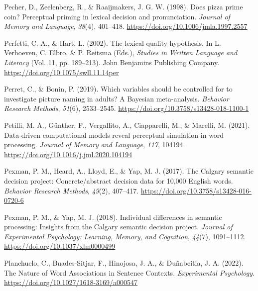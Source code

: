 \documentclass[
  12pt,
  man,floatsintext]{apa7}
\newlength{\cslhangindent}
\newlength{\cslentryspacingunit} %
\newenvironment{CSLReferences}[2] %
 {%
  \setlength{\parindent}{0pt}
  \ifodd #1
  \let\oldpar\par
  \def\par{\hangindent=\cslhangindent\oldpar}
  \fi
  \setlength{\parskip}{#2\cslentryspacingunit}
 }%
 {}
\begin{document}
\begin{CSLReferences}{1}{0}
\leavevmode{}%
Pecher, D., Zeelenberg, R., \& Raaijmakers, J. G. W. (1998). Does pizza prime coin? {Perceptual} priming in lexical decision and pronunciation. \emph{Journal of Memory and Language}, \emph{38}(4), 401--418. \url{https://doi.org/10.1006/jmla.1997.2557}

\leavevmode{}%
Perfetti, C. A., \& Hart, L. (2002). The lexical quality hypothesis. In L. Verhoeven, C. Elbro, \& P. Reitsma (Eds.), \emph{Studies in {Written Language} and {Literacy}} (Vol. 11, pp. 189--213). {John Benjamins Publishing Company}. \url{https://doi.org/10.1075/swll.11.14per}

\leavevmode{}%
Perret, C., \& Bonin, P. (2019). Which variables should be controlled for to investigate picture naming in adults? {A Bayesian} meta-analysis. \emph{Behavior Research Methods}, \emph{51}(6), 2533--2545. \url{https://doi.org/10.3758/s13428-018-1100-1}

\leavevmode{}%
Petilli, M. A., Günther, F., Vergallito, A., Ciapparelli, M., \& Marelli, M. (2021). Data-driven computational models reveal perceptual simulation in word processing. \emph{Journal of Memory and Language}, \emph{117}, 104194. \url{https://doi.org/10.1016/j.jml.2020.104194}

\leavevmode{}%
Pexman, P. M., Heard, A., Lloyd, E., \& Yap, M. J. (2017). The {Calgary} semantic decision project: {Concrete}/abstract decision data for 10,000 {English} words. \emph{Behavior Research Methods}, \emph{49}(2), 407--417. \url{https://doi.org/10.3758/s13428-016-0720-6}

\leavevmode{}%
Pexman, P. M., \& Yap, M. J. (2018). Individual differences in semantic processing: {Insights} from the {Calgary} semantic decision project. \emph{Journal of Experimental Psychology: Learning, Memory, and Cognition}, \emph{44}(7), 1091--1112. \url{https://doi.org/10.1037/xlm0000499}

\leavevmode{}%
Planchuelo, C., Buades-Sitjar, F., Hinojosa, J. A., \& Duñabeitia, J. A. (2022). The {Nature} of {Word Associations} in {Sentence Contexts}. \emph{Experimental Psychology}. \url{https://doi.org/10.1027/1618-3169/a000547}


\end{CSLReferences}
\end{document}
